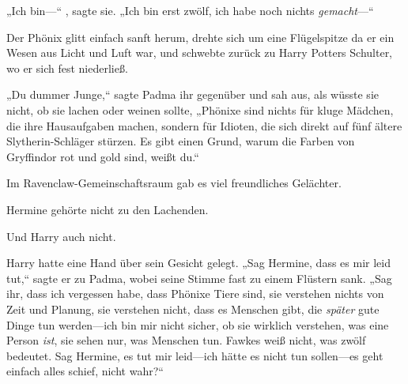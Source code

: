„Ich bin—“ , sagte sie. „Ich bin erst zwölf, ich habe noch nichts \emph{gemacht}—“

Der Phönix glitt einfach sanft herum, drehte sich um eine Flügelspitze da er ein Wesen aus Licht und Luft war, und schwebte zurück zu Harry Potters Schulter, wo er sich fest niederließ.

„Du dummer Junge,“ sagte Padma ihr gegenüber und sah aus, als wüsste sie nicht, ob sie lachen oder weinen sollte, „Phönixe sind nichts für kluge Mädchen, die ihre Hausaufgaben machen, sondern für Idioten, die sich direkt auf fünf ältere Slytherin-Schläger stürzen. Es gibt einen Grund, warum die Farben von Gryffindor rot und gold sind, weißt du.“

Im Ravenclaw-Gemeinschaftsraum gab es viel freundliches Gelächter.

Hermine gehörte nicht zu den Lachenden.

Und Harry auch nicht.

Harry hatte eine Hand über sein Gesicht gelegt. „Sag Hermine, dass es mir leid tut,“ sagte er zu Padma, wobei seine Stimme fast zu einem Flüstern sank. „Sag ihr, dass ich vergessen habe, dass Phönixe Tiere sind, sie verstehen nichts von Zeit und Planung, sie verstehen nicht, dass es Menschen gibt, die \emph{später} gute Dinge tun werden—ich bin mir nicht sicher, ob sie wirklich verstehen, was eine Person \emph{ist}, sie sehen nur, was Menschen tun. Fawkes weiß nicht, was zwölf bedeutet. Sag Hermine, es tut mir leid—ich hätte es nicht tun sollen—es geht einfach alles schief, nicht wahr?“

